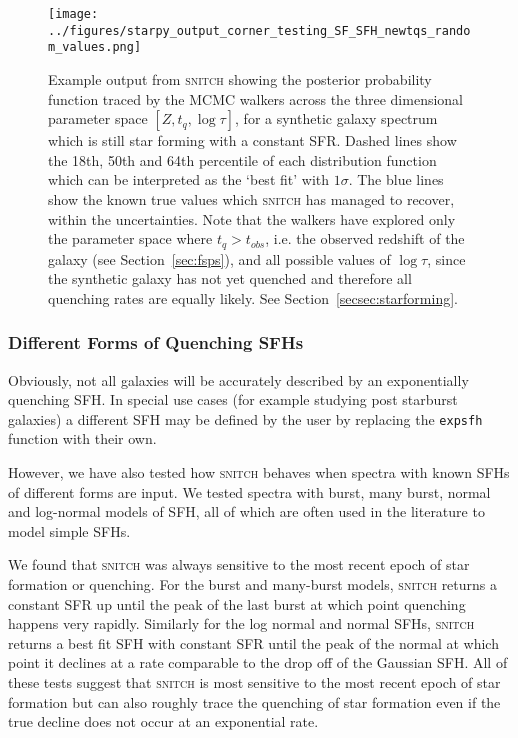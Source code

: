 \documentclass[useAMS,usenatbib]{mn2e}
\begin{document}
\begin{figure}
\centering
\texttt{[image: ../figures/starpy\_output\_corner\_testing\_SF\_SFH\_newtqs\_random\_values.png]}
\caption{Example output from \textsc{snitch} showing the posterior probability function traced by the MCMC walkers across the three dimensional parameter space $[Z,t_q,\log \tau]$, for a synthetic galaxy spectrum which is still star forming with a constant SFR.  Dashed lines show the 18th, 50th and 64th percentile of each distribution function which can be interpreted as the `best fit' with $1\sigma$. The blue lines show the known true values which \textsc{snitch} has managed to recover, within the uncertainties. Note that the walkers have explored only the parameter space where $t_q > t_{obs}$, i.e. the observed redshift of the galaxy (see Section~\ref{sec:fsps}), and all possible values of $\log \tau$, since the synthetic galaxy has not yet quenched and therefore all quenching rates are equally likely. See Section~\ref{secsec:starforming}.}
\label{fig:sfgal}
\end{figure}


\subsubsection{Different Forms of Quenching SFHs}

Obviously, not all galaxies will be accurately described by an exponentially quenching SFH. In special use cases (for example studying post starburst galaxies) a different SFH may be defined by the user by replacing the \texttt{expsfh} function with their own. 

However, we have also tested how \textsc{snitch} behaves when spectra with known SFHs of different forms are input. We tested spectra with burst, many burst, normal and log-normal models of SFH, all of which are often used in the literature to model simple SFHs. 

We found that \textsc{snitch} was always sensitive to the most recent epoch of star formation or quenching. For the burst and many-burst models, \textsc{snitch} returns a constant SFR up until the peak of the last burst at which point quenching happens very rapidly. Similarly for the log normal and normal SFHs, \textsc{snitch} returns a best fit SFH with constant SFR until the peak of the normal at which point it declines at a rate comparable to the drop off of the Gaussian SFH. All of these tests suggest that \textsc{snitch} is most sensitive to the most recent epoch of star formation but can also roughly trace the quenching of star formation even if the true decline does not occur at an exponential rate. 
\end{document}
